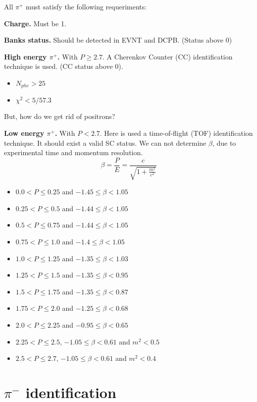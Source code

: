All $\pi^{+}$ must satisfy the following requeriments:

\textbf{Charge.} Must be 1.

\textbf{Banks status.} Should be detected in EVNT and DCPB. (Status above 0)

\textbf{High energy $\pi^+$.} With $P \ge 2.7$. A Cherenkov Counter (CC) identification technique is used. (CC status above 0).
\begin{itemize}
\item $N_{phe} > 25$
\item $\chi^2 < 5/57.3$
\end{itemize}
But, how do we get rid of positrons?

\textbf{Low energy $\pi^+$.} With $P < 2.7$. Here is used a time-of-flight (TOF) identification technique. It should exist a valid SC status. We can not determine $\beta$, due to experimental time and momentum resolution.
\begin{equation}
  \beta = \frac{P}{E} = \frac{c}{\sqrt{1 + \frac{m^2}{c^2}}}
\end{equation}


\begin{itemize}
    \item $0.0 < P \le 0.25$ and $-1.45 \le \beta < 1.05$
    \item $0.25 < P \le 0.5$ and $-1.44 \le \beta < 1.05$
    \item $0.5 < P \le 0.75$ and $-1.44 \le \beta < 1.05$
    \item $0.75 < P \le 1.0$ and $-1.4 \le \beta < 1.05$
    \item $1.0 < P \le 1.25$ and $-1.35 \le \beta < 1.03$
    \item $1.25 < P \le 1.5$ and $-1.35 \le \beta < 0.95$
    \item $1.5 < P \le 1.75$ and $-1.35 \le \beta < 0.87$
    \item $1.75 < P \le 2.0$ and $-1.25 \le \beta < 0.68$
    \item $2.0 < P \le 2.25$ and $-0.95 \le \beta < 0.65$
    \item $2.25 < P \le 2.5$, $-1.05 \le \beta < 0.61$ and $m^2 < 0.5$
    \item $2.5 < P \le 2.7$, $-1.05 \le \beta < 0.61$ and $m^2 < 0.4$
\end{itemize}

\section{$\pi^{-}$ identification}

